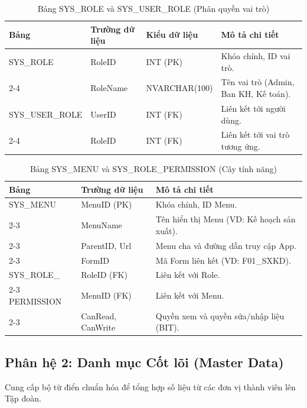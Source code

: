 \documentclass[12pt,a4paper]{article}
\begin{document}
\begin{table}[h!]
    \centering
    \caption{Bảng SYS\_ROLE và SYS\_USER\_ROLE (Phân quyền vai trò)}
    \begin{tabularx}{\textwidth}{|l|l|l|X|}
        \hline
        \textbf{Bảng} & \textbf{Trường dữ liệu} & \textbf{Kiểu dữ liệu} & \textbf{Mô tả chi tiết} \\ \hline
        SYS\_ROLE & RoleID & INT (PK) & Khóa chính, ID vai trò. \\ \cline{2-4}
                  & RoleName & NVARCHAR(100) & Tên vai trò (Admin, Ban KH, Kế toán). \\ \hline
        SYS\_USER\_ROLE & UserID & INT (FK) & Liên kết tới người dùng. \\ \cline{2-4}
                  & RoleID & INT (FK) & Liên kết tới vai trò tương ứng. \\ \hline
    \end{tabularx}
\end{table}

\begin{table}[h!]
    \centering
    \caption{Bảng SYS\_MENU và SYS\_ROLE\_PERMISSION (Cây tính năng)}
    \begin{tabularx}{\textwidth}{|l|l|X|}
        \hline
        \textbf{Bảng} & \textbf{Trường dữ liệu} & \textbf{Mô tả chi tiết} \\ \hline
        SYS\_MENU & MenuID (PK) & Khóa chính, ID Menu. \\ \cline{2-3}
                  & MenuName & Tên hiển thị Menu (VD: Kế hoạch sản xuất). \\ \cline{2-3}
                  & ParentID, Url & Menu cha và đường dẫn truy cập App. \\ \cline{2-3}
                  & FormID & Mã Form liên kết (VD: F01\_SXKD). \\ \hline
        SYS\_ROLE\_ & RoleID (FK) & Liên kết với Role. \\ \cline{2-3}
        PERMISSION& MenuID (FK) & Liên kết với Menu. \\ \cline{2-3}
                  & CanRead, CanWrite & Quyền xem và quyền sửa/nhập liệu (BIT). \\ \hline
    \end{tabularx}
\end{table}

\subsection{Phân hệ 2: Danh mục Cốt lõi (Master Data)}
Cung cấp bộ từ điển chuẩn hóa để tổng hợp số liệu từ các đơn vị thành viên lên Tập đoàn.
\end{document}

